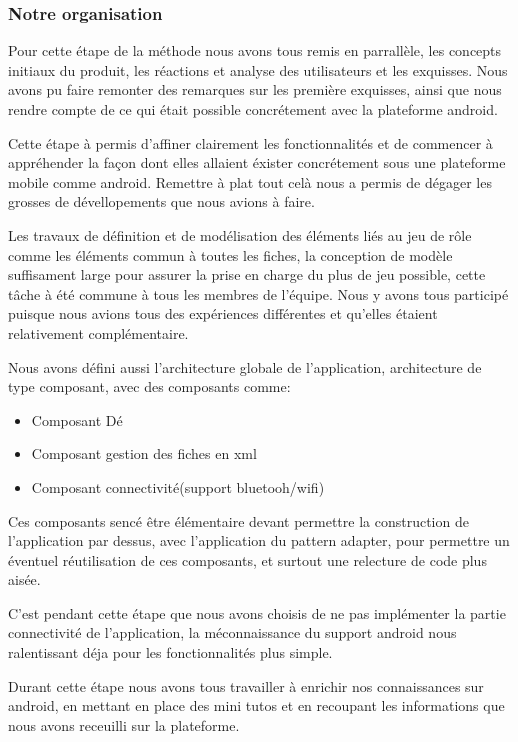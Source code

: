 \documentclass[11pt,a4paper]{article}
\begin{document}
\subsubsection{Notre organisation}

Pour cette étape de la méthode nous avons tous remis en parrallèle, les concepts initiaux 
du produit, les réactions et analyse des utilisateurs et les exquisses. Nous avons pu faire remonter des
remarques sur les première exquisses, ainsi que nous rendre compte de ce qui était possible concrétement
avec la plateforme android.

Cette étape à permis d'affiner clairement les fonctionnalités et de commencer à appréhender la façon dont elles 
allaient éxister concrétement sous une plateforme mobile comme android. Remettre à plat tout celà
nous a permis de dégager les grosses de dévellopements que nous avions à faire.

Les travaux de définition et de modélisation des éléments liés au jeu de rôle comme les éléments commun à toutes les fiches,
la conception de modèle suffisament large pour assurer la prise en charge du plus de jeu possible, cette tâche à été commune à tous
les membres de l'équipe. Nous y avons tous participé puisque nous avions tous des expériences différentes et qu'elles étaient relativement complémentaire.

Nous avons défini aussi l'architecture globale de l'application, architecture de type composant, avec des composants comme:
\begin{itemize}
  \item Composant Dé
  \item Composant gestion des fiches en xml
  \item Composant connectivité(support bluetooh/wifi)
\end{itemize}

Ces composants sencé être élémentaire devant permettre la construction de l'application par dessus, avec l'application du pattern 
adapter, pour permettre un éventuel réutilisation de ces composants, et surtout une relecture de code plus aisée.

C'est pendant cette étape que nous avons choisis de ne pas implémenter la partie connectivité de l'application,
la méconnaissance du support android nous ralentissant déja pour les fonctionnalités plus simple.

Durant cette étape nous avons tous travailler à enrichir nos connaissances sur android, en mettant en place 
des mini tutos et en recoupant les informations que nous avons receuilli sur la plateforme.
\end{document}

